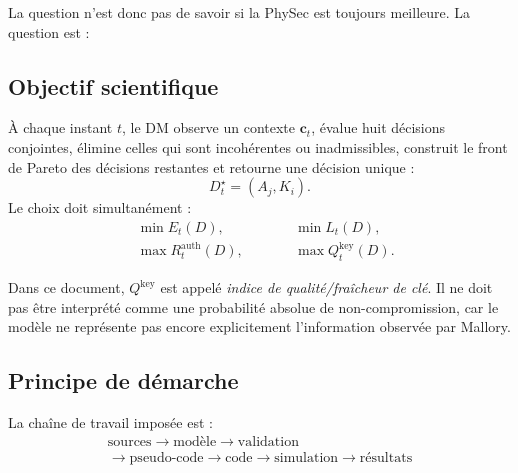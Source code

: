 \documentclass[conference,a4paper]{IEEEtran}
\newcommand{\Rauth}{R^{\mathrm{auth}}}
\newcommand{\Rkey}{Q^{\mathrm{key}}}
\begin{document}
La question n'est donc pas de savoir si la PhySec est toujours meilleure. La question est :

\vspace{.4em}
\noindent{}
\vspace{.4em}

\subsection{Objectif scientifique}
À chaque instant $t$, le DM observe un contexte $\mathbf{c}_t$, évalue huit décisions conjointes, élimine celles qui sont incohérentes ou inadmissibles, construit le front de Pareto des décisions restantes et retourne une décision unique :
\begin{equation}
D_t^\star=(A_j,K_i).
\end{equation}
Le choix doit simultanément :
\begin{equation}
\begin{aligned}
&\min E_t(D),\qquad &&\min L_t(D),\\
&\max \Rauth_t(D),\qquad &&\max \Rkey_t(D).
\end{aligned}
\label{eq:four-objectives}
\end{equation}

Dans ce document, $\Rkey$ est appelé \emph{indice de qualité/fraîcheur de clé}. Il ne doit pas être interprété comme une probabilité absolue de non-compromission, car le modèle ne représente pas encore explicitement l'information observée par Mallory.

\subsection{Principe de démarche}
La chaîne de travail imposée est :
\begin{equation}
\boxed{\begin{gathered}
\text{sources}\rightarrow\text{modèle}\rightarrow\text{validation}\\
\rightarrow\text{pseudo-code}\rightarrow\text{code}\rightarrow\text{simulation}\rightarrow\text{résultats}
\end{gathered}}
\end{equation}
\end{document}

